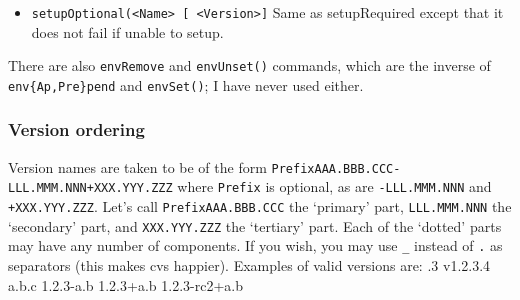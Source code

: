 \documentclass{article}
\newcommand{\code}[1]{\texttt{#1}}
\let\overbatim=\verbatim
\let\oendverbatim=\endverbatim
\renewenvironment{verbatim}
{\center\minipage{16cm}\overbatim}
{\oendverbatim\endminipage\endcenter}
\begin{document}
\begin{itemize}
     \code{Version} may in fact be a logical expression, specifying acceptable
     versions. Permitted relational expressions are \code{>}, \code{>=}, \code{==},
     \code{<}, and \code{<=}. More than one expression may be joined using \code{||}
     (\code{\&\&} is not supported due to laziness).  For example,
\begin{verbatim}
    setupRequired(foo 1.2)
    setupRequired(foo == 1.2)
    setupRequired(foo >= 1.2)
    setupRequired(foo < 1.3)
    setupRequired(foo >= 1.2 || == rhl)
    setupRequired(foo >= 1.2 || rhl || svn)
\end{verbatim}
    The \code{==} is optional.  See the Sec. \ref{versionOrdering} for the definition
    of the ordering applied to version names.

    If more than one version matches the specified condition, priority is
    given to the version declared current;  if there is no current
    version, or it doesn't satisfy the condition, the highest valid version number
    is used.

    You may sometimes want to ignore explicit versions (e.g. if you are testing
    a new version, installed and current as \code{rhl}, but the table file specifies a
    version \code{> 1.2}).  You can do this with \code{setup -i} or \code{--ignore-versions}.

   \item \code{setupOptional(<Name> [ <Version>]}
     Same as setupRequired except that it does not fail if unable to setup.
\end{itemize}

There are also \code{envRemove} and \code{envUnset()} commands, which
are the inverse of \code{env\{Ap,Pre\}pend} and \code{envSet()}; I have
never used either.     

\subsubsection{Version ordering}
\label{versionOrdering}

Version names are taken to be of the form \code{PrefixAAA.BBB.CCC-LLL.MMM.NNN+XXX.YYY.ZZZ}
where \code{Prefix} is optional, as are \code{-LLL.MMM.NNN} and \code{+XXX.YYY.ZZZ}.  Let's call
\code{PrefixAAA.BBB.CCC} the `primary' part, \code{LLL.MMM.NNN} the `secondary' part, and \code{XXX.YYY.ZZZ}
the `tertiary' part.
Each of the `dotted' parts may have any number of components. If you wish, you may use \code{\_}
instead of \code{.} as separators (this makes cvs happier).  Examples of valid
versions are:
\begin{verbatim}
  1.2.3
  v1.2.3.4
  a.b.c
  1.2.3-a.b
  1.2.3+a.b
  1.2.3-rc2+a.b
\end{verbatim}
\end{document}
